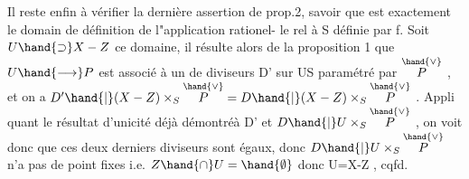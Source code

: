 Il reste enfin à vérifier la dernière assertion de prop.2, savoir
que  est exactement le domain de définition de l"application rationel-%
le rel à S définie par f. Soit $U\hand{\supset} X-Z$ ce domaine, il résulte alors de
la proposition 1 que $U\hand{\longrightarrow} P$ est associé à un de diviseurs
D' sur US paramétré par $\overset{\hand{\vee}}{P}$ , et on a $D'\hand{|}(X-Z)\times_S\overset{\hand{\vee}}{P} = D\hand{|}(X-Z)\times_S\overset{\hand{\vee}}{P}$ . Appli
quant le résultat d'unicité \hand{(}déjà démontré\hand{)}à D' et $D\hand{|}U\times_S\overset{\hand{\vee}}{P}$ , on voit donc
que ces deux derniers diviseurs sont égaux, donc $D\hand{|}U\times_S\overset{\hand{\vee}}{P}$ n'a pas de
point fixes i.e. $Z\hand{\cap} U=\hand{\emptyset}$ donc U=X-Z , cqfd.

